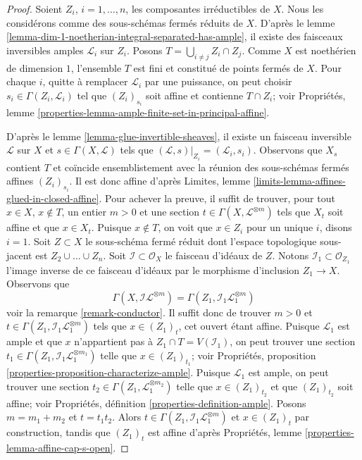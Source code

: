 \begin{proof}
Soient $Z_i$, $i = 1, \ldots, n$, les composantes irréductibles de $X$.
Nous les considérons comme des sous-schémas fermés réduits de $X$.
D'après le lemme \ref{lemma-dim-1-noetherian-integral-separated-has-ample},
il existe des faisceaux inversibles amples $\mathcal{L}_i$ sur $Z_i$.
Posons $T = \bigcup_{i \not = j} Z_i \cap Z_j$. Comme $X$ est noethérien
de dimension $1$, l'ensemble $T$ est fini et constitué de points fermés
de $X$. Pour chaque $i$, quitte à remplacer
$\mathcal{L}_i$ par une puissance, on peut choisir $s_i \in \Gamma(Z_i, \mathcal{L}_i)$
tel que $(Z_i)_{s_i}$ soit affine et contienne $T \cap Z_i$; voir
Propriétés, lemme \ref{properties-lemma-ample-finite-set-in-principal-affine}.

\medskip\noindent
D'après le lemme \ref{lemma-glue-invertible-sheaves}, il existe un faisceau inversible
$\mathcal{L}$ sur $X$ et $s \in \Gamma(X, \mathcal{L})$
tels que $(\mathcal{L}, s)|_{Z_i} = (\mathcal{L}_i, s_i)$.
Observons que $X_s$ contient $T$ et coïncide ensemblistement
avec la réunion des sous-schémas fermés affines $(Z_i)_{s_i}$. Il est donc affine d'après
Limites, lemme \ref{limits-lemma-affines-glued-in-closed-affine}.
Pour achever la preuve, il suffit de trouver, pour tout $x \in X$, $x \not \in T$,
un entier $m > 0$ et une section $t \in \Gamma(X, \mathcal{L}^{\otimes m})$
tels que $X_t$ soit affine et que $x \in X_t$. Puisque $x \not \in T$,
on voit que $x \in Z_i$ pour un unique $i$, disons $i = 1$.
Soit $Z \subset X$ le sous-schéma fermé réduit dont l'espace
topologique sous-jacent est $Z_2 \cup \ldots \cup Z_n$.
Soit $\mathcal{I} \subset \mathcal{O}_X$ le faisceau
d'idéaux de $Z$. Notons $\mathcal{I}_1 \subset \mathcal{O}_{Z_1}$
l'image inverse de ce faisceau d'idéaux par le morphisme
d'inclusion $Z_1 \to X$. Observons que
$$
\Gamma(X, \mathcal{I}\mathcal{L}^{\otimes m}) =
\Gamma(Z_1, \mathcal{I}_1 \mathcal{L}_1^{\otimes m})
$$
voir la remarque \ref{remark-conductor}. Il suffit donc de trouver $m > 0$
et $t \in \Gamma(Z_1, \mathcal{I}_1 \mathcal{L}_1^{\otimes m})$
tels que $x \in (Z_1)_t$, cet ouvert étant affine. Puisque $\mathcal{L}_1$ est ample
et que $x$ n'appartient pas à $Z_1 \cap T = V(\mathcal{I}_1)$,
on peut trouver une section
$t_1 \in \Gamma(Z_1, \mathcal{I}_1 \mathcal{L}_1^{\otimes m_1})$
telle que $x \in (Z_1)_{t_1}$; voir Propriétés, proposition
\ref{properties-proposition-characterize-ample}.
Puisque $\mathcal{L}_1$ est ample, on peut trouver une section
$t_2 \in \Gamma(Z_1, \mathcal{L}_1^{\otimes m_2})$
telle que $x \in (Z_1)_{t_2}$ et que $(Z_1)_{t_2}$ soit affine; voir
Propriétés, définition \ref{properties-definition-ample}.
Posons $m = m_1 + m_2$ et $t = t_1 t_2$. Alors
$t \in \Gamma(Z_1, \mathcal{I}_1 \mathcal{L}_1^{\otimes m})$
et $x \in (Z_1)_t$ par construction, tandis que
$(Z_1)_t$ est affine d'après Propriétés, lemme
\ref{properties-lemma-affine-cap-s-open}.
\end{proof}

